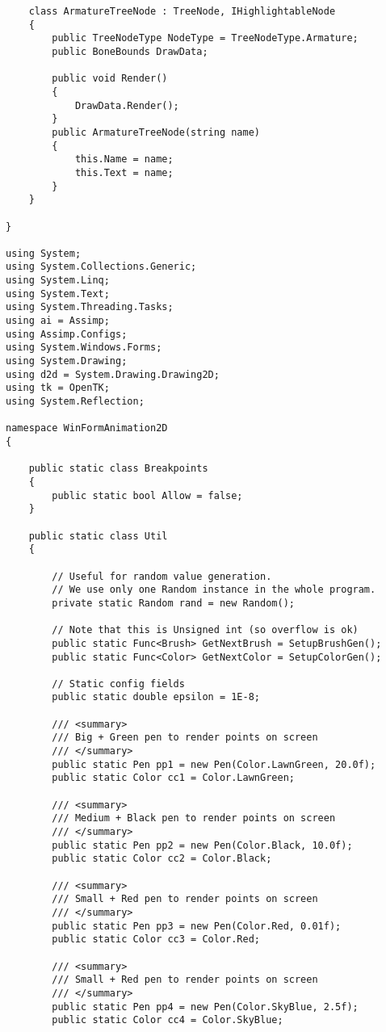 \begin{scriptsize}
\begin{verbatim}
    class ArmatureTreeNode : TreeNode, IHighlightableNode
    {
        public TreeNodeType NodeType = TreeNodeType.Armature;
        public BoneBounds DrawData;

        public void Render()
        {
            DrawData.Render();
        }
        public ArmatureTreeNode(string name)
        {
            this.Name = name;
            this.Text = name;
        }
    }

}

using System;
using System.Collections.Generic;
using System.Linq;
using System.Text;
using System.Threading.Tasks;
using ai = Assimp;
using Assimp.Configs;
using System.Windows.Forms;
using System.Drawing;
using d2d = System.Drawing.Drawing2D;
using tk = OpenTK;
using System.Reflection;

namespace WinFormAnimation2D
{

    public static class Breakpoints
    {
        public static bool Allow = false;
    }

    public static class Util
    {

        // Useful for random value generation. 
        // We use only one Random instance in the whole program.
        private static Random rand = new Random();

        // Note that this is Unsigned int (so overflow is ok)
        public static Func<Brush> GetNextBrush = SetupBrushGen();
        public static Func<Color> GetNextColor = SetupColorGen();

        // Static config fields
        public static double epsilon = 1E-8;

        /// <summary>
        /// Big + Green pen to render points on screen
        /// </summary>
        public static Pen pp1 = new Pen(Color.LawnGreen, 20.0f);
        public static Color cc1 = Color.LawnGreen;

        /// <summary>
        /// Medium + Black pen to render points on screen
        /// </summary>
        public static Pen pp2 = new Pen(Color.Black, 10.0f);
        public static Color cc2 = Color.Black;

        /// <summary>
        /// Small + Red pen to render points on screen
        /// </summary>
        public static Pen pp3 = new Pen(Color.Red, 0.01f);
        public static Color cc3 = Color.Red;

        /// <summary>
        /// Small + Red pen to render points on screen
        /// </summary>
        public static Pen pp4 = new Pen(Color.SkyBlue, 2.5f);
        public static Color cc4 = Color.SkyBlue;


\end{verbatim}
\end{scriptsize}
